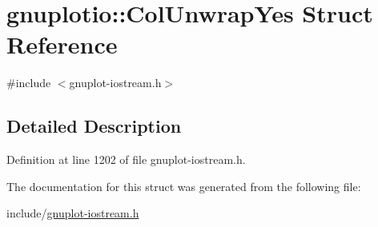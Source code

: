 \hypertarget{structgnuplotio_1_1_col_unwrap_yes}{}\section{gnuplotio\+:\+:Col\+Unwrap\+Yes Struct Reference}
\label{structgnuplotio_1_1_col_unwrap_yes}


{\ttfamily \#include $<$gnuplot-\/iostream.\+h$>$}



\subsection{Detailed Description}


Definition at line 1202 of file gnuplot-\/iostream.\+h.



The documentation for this struct was generated from the following file\+:\begin{DoxyCompactItemize}
\item 
include/\hyperlink{gnuplot-iostream_8h}{gnuplot-\/iostream.\+h}\end{DoxyCompactItemize}
